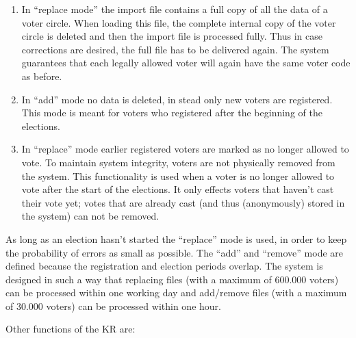 \begin{enumerate}
	\item In ``replace mode'' the import file contains a full copy
	of all the data of a voter circle. When loading this file, the
	complete internal copy of the voter circle is deleted and then
	the import file is processed fully. Thus in case corrections
	are desired, the full file has to be delivered again. The
	system guarantees that each legally allowed voter will again
	have the same voter code as before.

	\item In ``add'' mode no data is deleted, in stead only new
	voters are registered. This mode is meant for voters who
	registered after the beginning of the elections.

	\item In ``replace'' mode earlier registered voters are marked
	as no longer allowed to vote. To maintain system integrity,
	voters are not physically removed from the system. This
	functionality is used when a voter is no longer allowed to
	vote after the start of the elections. It only effects voters
	that haven't cast their vote yet; votes that are already cast
	(and thus (anonymously) stored in the system) can not be
	removed.

\end{enumerate}

As long as an election hasn't started the ``replace'' mode is used, in
order to keep the probability of errors as small as possible. The
``add'' and ``remove'' mode are defined because the registration and
election periods overlap. The system is designed in such a way that
replacing files (with a maximum of 600.000 voters) can be processed
within one working day and add/remove files (with a maximum of 30.000
voters) can be processed within one hour.

Other functions of the KR are:

